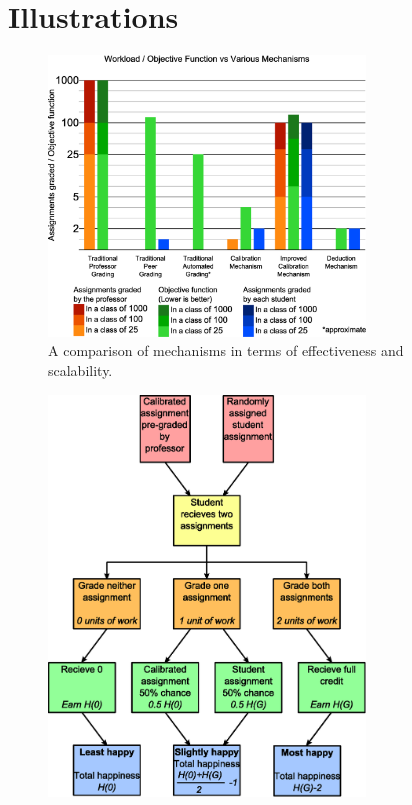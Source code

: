 \documentclass[12pt, Arial]{article}
\begin{document}
\section{Illustrations}
{
\noindent
\begin{figure}[!h]
	\centering
		\includegraphics[width=0.75\textwidth]{Comparison.eps}
		\caption {A comparison of mechanisms in terms of effectiveness and scalability.\label{fig:comparison}}
\end{figure}
\begin{figure}
	\centering
		\includegraphics[width=0.75\textwidth]{Flowchart-Calibration.eps}

\end{figure}}
\end{document}
